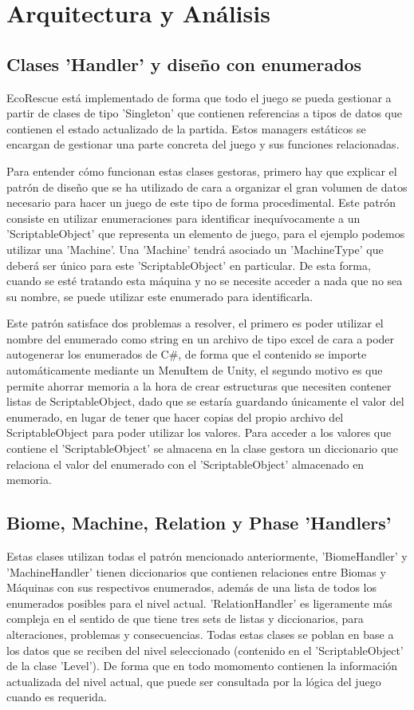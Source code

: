 \section{Arquitectura y Análisis}
\subsection{Clases 'Handler' y diseño con enumerados}
EcoRescue está implementado de forma que todo el juego se pueda gestionar a partir de clases de tipo 'Singleton' que contienen referencias a tipos de datos que contienen el estado actualizado de la partida. Estos managers estáticos se encargan de gestionar una parte concreta del juego y sus funciones relacionadas.

Para entender cómo funcionan estas clases gestoras, primero hay que explicar el patrón de diseño que se ha utilizado de cara a organizar el gran volumen de datos necesario para hacer un juego de este tipo de forma procedimental. Este patrón consiste en utilizar enumeraciones para identificar inequívocamente a un 'ScriptableObject' que representa un elemento de juego, para el ejemplo podemos utilizar una 'Machine'. Una 'Machine' tendrá asociado un 'MachineType' que deberá ser único para este 'ScriptableObject' en particular. De esta forma, cuando se esté tratando esta máquina y no se necesite acceder a nada que no sea su nombre, se puede utilizar este enumerado para identificarla. 

Este patrón satisface dos problemas a resolver, el primero es poder utilizar el nombre del enumerado como string en un archivo de tipo excel de cara a poder autogenerar los enumerados de C\#, de forma que el contenido se importe automáticamente mediante un MenuItem de Unity, el segundo motivo es que permite ahorrar memoria a la hora de crear estructuras que necesiten contener listas de ScriptableObject, dado que se estaría guardando únicamente el valor del enumerado, en lugar de tener que hacer copias del propio archivo del ScriptableObject para poder utilizar los valores. Para acceder a los valores que contiene el 'ScriptableObject' se almacena en la clase gestora un diccionario que relaciona el valor del enumerado con el 'ScriptableObject' almacenado en memoria. 

\subsection{Biome, Machine, Relation y Phase 'Handlers'}

Estas clases utilizan todas el patrón mencionado anteriormente, 'BiomeHandler' y 'MachineHandler' tienen diccionarios que contienen relaciones entre Biomas y Máquinas con sus respectivos enumerados, además de una lista de todos los enumerados posibles para el nivel actual. 'RelationHandler' es ligeramente más compleja en el sentido de que tiene tres sets de listas y diccionarios, para alteraciones, problemas y consecuencias. Todas estas clases se poblan en base a los datos que se reciben del nivel seleccionado (contenido en el 'ScriptableObject' de la clase 'Level'). De forma que en todo momomento contienen la información actualizada del nivel actual, que puede ser consultada por la lógica del juego cuando es requerida. 

